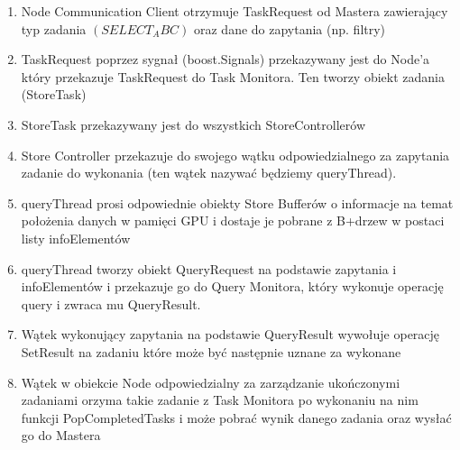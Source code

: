 \documentclass[paper=a4, fontsize=11pt]{scrartcl} %
\numberwithin{equation}{section} %
\numberwithin{figure}{section} %
\numberwithin{table}{section} %
\begin{document}
		\begin{enumerate}
			\item Node Communication Client otrzymuje TaskRequest od Mastera zawierający typ zadania $(SELECT_ABC)$ oraz dane do zapytania (np. filtry)
			\item TaskRequest poprzez sygnał (boost.Signals) przekazywany jest do Node'a który przekazuje TaskRequest do Task Monitora. Ten tworzy 
				obiekt zadania (StoreTask)
			\item StoreTask przekazywany jest do wszystkich StoreControllerów
			\item Store Controller przekazuje do swojego wątku odpowiedzialnego za zapytania zadanie do wykonania (ten wątek nazywać będziemy queryThread). 
			\item queryThread prosi odpowiednie obiekty Store Bufferów o informacje na temat położenia danych w pamięci GPU i dostaje je pobrane z B+drzew w postaci listy infoElementów
			\item queryThread tworzy obiekt QueryRequest na podstawie zapytania i infoElementów i przekazuje go do Query Monitora, który wykonuje operację query i zwraca mu QueryResult. 
			\item Wątek wykonujący zapytania na podstawie QueryResult wywołuje operację SetResult na zadaniu które może być następnie uznane za wykonane
			\item Wątek w obiekcie Node odpowiedzialny za zarządzanie ukończonymi zadaniami orzyma takie zadanie z Task Monitora po wykonaniu na nim funkcji PopCompletedTasks
				i może pobrać wynik danego zadania oraz wysłać go do Mastera 
		\end{enumerate}
\end{document}
